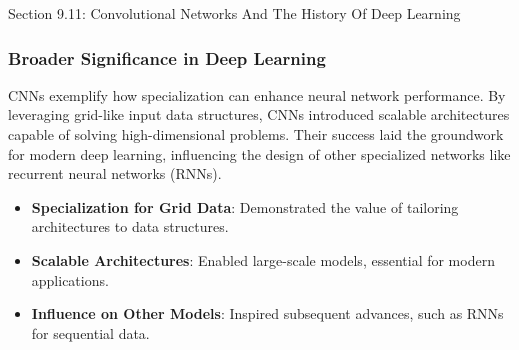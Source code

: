 \begin{notes}{Section 9.11: Convolutional Networks And The History Of Deep Learning}
    \subsubsection*{Broader Significance in Deep Learning}
    
    CNNs exemplify how specialization can enhance neural network performance. By leveraging grid-like input data structures, CNNs introduced scalable architectures capable of solving high-dimensional 
    problems. Their success laid the groundwork for modern deep learning, influencing the design of other specialized networks like recurrent neural networks (RNNs).
    
    \begin{highlight}
        \begin{itemize}
            \item \textbf{Specialization for Grid Data}: Demonstrated the value of tailoring architectures to data structures.
            \item \textbf{Scalable Architectures}: Enabled large-scale models, essential for modern applications.
            \item \textbf{Influence on Other Models}: Inspired subsequent advances, such as RNNs for sequential data.
        \end{itemize}
    \end{highlight}
\end{notes}